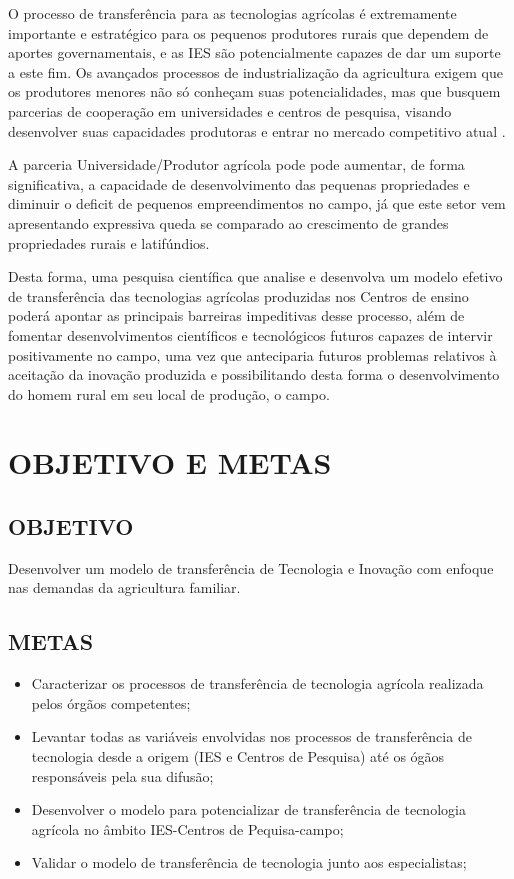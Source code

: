 O processo de transferência para as tecnologias agrícolas é extremamente importante e  estratégico para os pequenos produtores rurais que dependem de aportes governamentais, e as IES são potencialmente  capazes de dar um suporte a este fim. Os avançados processos de industrialização da agricultura exigem que os produtores menores não só conheçam suas potencialidades, mas que busquem parcerias de cooperação em universidades e centros de pesquisa, visando desenvolver suas capacidades produtoras e entrar no mercado competitivo atual \cite{silva_modelo_2016}.

A parceria Universidade/Produtor agrícola pode pode aumentar, de forma significativa, a capacidade de desenvolvimento das pequenas propriedades e diminuir o deficit de pequenos empreendimentos no campo, já que este setor vem apresentando expressiva queda se comparado ao crescimento de grandes propriedades rurais e latifúndios. 

Desta forma, uma pesquisa científica que analise e desenvolva um modelo efetivo de transferência das tecnologias agrícolas produzidas nos Centros de ensino poderá apontar as principais barreiras impeditivas desse processo, além de fomentar desenvolvimentos científicos e tecnológicos futuros capazes de intervir positivamente no campo, uma vez que anteciparia futuros problemas relativos à aceitação da inovação produzida e possibilitando desta forma o desenvolvimento do homem rural em seu local de produção, o campo.

\section{OBJETIVO E METAS}

\subsection{OBJETIVO}
Desenvolver um modelo de transferência de Tecnologia e Inovação com enfoque nas demandas da agricultura familiar.

\subsection{METAS}

\begin{itemize}
\item{Caracterizar os processos de transferência de tecnologia agrícola realizada pelos órgãos competentes;}
\item {Levantar todas as variáveis envolvidas nos processos de transferência de tecnologia desde a  origem (IES e Centros de Pesquisa) até os ógãos responsáveis pela sua difusão;}
\item {Desenvolver o modelo para potencializar de transferência de tecnologia agrícola no âmbito IES-Centros de Pequisa-campo;}
\item {Validar o modelo de transferência de tecnologia junto aos especialistas;}
\end{itemize}


